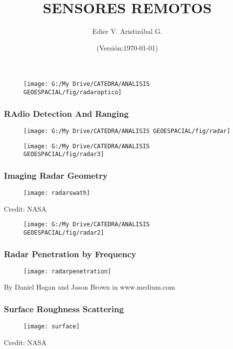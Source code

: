 \documentclass[14pt]{beamer}
\title[Sensores Activos]{SENSORES REMOTOS}
\author[Edier Aristizábal]{Edier V. Aristizábal G.}
\institute{\emph{evaristizabalg@unal.edu.co}}
\date{(Versión:\today)}
\begin{document}
\begin{frame}
 \begin{figure}
    \centering
    \texttt{[image: G:/My Drive/CATEDRA/ANALISIS GEOESPACIAL/fig/radaroptico]}
  \end{figure}
\end{frame}
\begin{frame}
\frametitle{\textbf{RA}dio \textbf{D}etection \textbf{A}nd \textbf{R}anging}
 \begin{figure}
    \centering
    \texttt{[image: G:/My Drive/CATEDRA/ANALISIS GEOESPACIAL/fig/radar]}
  \end{figure}
\end{frame}
\begin{frame}
 \begin{figure}
    \centering
    \texttt{[image: G:/My Drive/CATEDRA/ANALISIS GEOESPACIAL/fig/radar3]}
  \end{figure}
\end{frame}
\begin{frame}
\frametitle{Imaging Radar Geometry}
 \begin{figure}
    \centering
    \texttt{[image: radarswath]}
  \end{figure}
\tiny{Credit: NASA}
\end{frame}
\begin{frame}
 \begin{figure}
    \centering
    \texttt{[image: G:/My Drive/CATEDRA/ANALISIS GEOESPACIAL/fig/radar2]}
  \end{figure}
\end{frame}
\begin{frame}
\frametitle{Radar Penetration by Frequency}
 \begin{figure}
    \centering
    \texttt{[image: radarpenetration]}
  \end{figure}
\tiny{By Daniel Hogan and Jason Brown in www.medium.com}
\end{frame}
\begin{frame}
\frametitle{Surface Roughness Scattering}
 \begin{figure}
    \centering
    \texttt{[image: surface]}
  \end{figure}
\tiny{Credit: NASA}
\end{frame}
\end{document}
